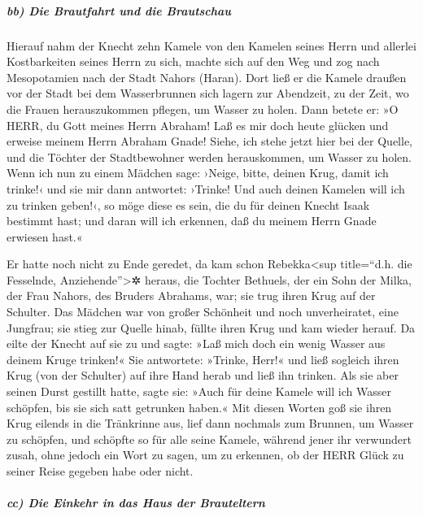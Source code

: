 \hypertarget{bb-die-brautfahrt-und-die-brautschau}{%
\subparagraph{bb) Die Brautfahrt und die
Brautschau}\label{bb-die-brautfahrt-und-die-brautschau}}

 Hierauf nahm der Knecht zehn Kamele von den Kamelen
seines Herrn und allerlei Kostbarkeiten seines Herrn zu sich, machte
sich auf den Weg und zog nach Mesopotamien nach der Stadt Nahors
(Haran).  Dort ließ er die Kamele draußen vor der Stadt
bei dem Wasserbrunnen sich lagern zur Abendzeit, zu der Zeit, wo die
Frauen herauszukommen pflegen, um Wasser zu holen.  Dann
betete er: »O HERR, du Gott meines Herrn Abraham! Laß es mir doch heute
glücken und erweise meinem Herrn Abraham Gnade!  Siehe,
ich stehe jetzt hier bei der Quelle, und die Töchter der Stadtbewohner
werden herauskommen, um Wasser zu holen.  Wenn ich nun zu
einem Mädchen sage: ›Neige, bitte, deinen Krug, damit ich trinke!‹ und
sie mir dann antwortet: ›Trinke! Und auch deinen Kamelen will ich zu
trinken geben!‹, so möge diese es sein, die du für deinen Knecht Isaak
bestimmt hast; und daran will ich erkennen, daß du meinem Herrn Gnade
erwiesen hast.«

 Er hatte noch nicht zu Ende geredet, da kam schon
Rebekka\textless sup title=``d.h. die Fesselnde,
Anziehende''\textgreater✲ heraus, die Tochter Bethuels, der ein Sohn der
Milka, der Frau Nahors, des Bruders Abrahams, war; sie trug ihren Krug
auf der Schulter.  Das Mädchen war von großer Schönheit
und noch unverheiratet, eine Jungfrau; sie stieg zur Quelle hinab,
füllte ihren Krug und kam wieder herauf.  Da eilte der
Knecht auf sie zu und sagte: »Laß mich doch ein wenig Wasser aus deinem
Kruge trinken!«  Sie antwortete: »Trinke, Herr!« und ließ
sogleich ihren Krug (von der Schulter) auf ihre Hand herab und ließ ihn
trinken.  Als sie aber seinen Durst gestillt hatte, sagte
sie: »Auch für deine Kamele will ich Wasser schöpfen, bis sie sich satt
getrunken haben.«  Mit diesen Worten goß sie ihren Krug
eilends in die Tränkrinne aus, lief dann nochmals zum Brunnen, um Wasser
zu schöpfen, und schöpfte so für alle seine Kamele, 
während jener ihr verwundert zusah, ohne jedoch ein Wort zu sagen, um zu
erkennen, ob der HERR Glück zu seiner Reise gegeben habe oder nicht.

\hypertarget{cc-die-einkehr-in-das-haus-der-brauteltern}{%
\subparagraph{cc) Die Einkehr in das Haus der
Brauteltern}\label{cc-die-einkehr-in-das-haus-der-brauteltern}}

